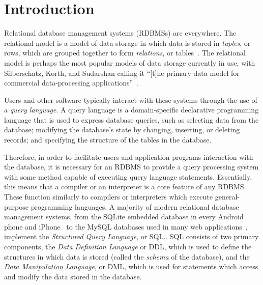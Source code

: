 

\usepackage{minted}
\usepackage{hyperref}
\usepackage{cleveref}
\usepackage{lmodern}
\usepackage{placeins}


\MYHEADERS{}
\PLEDGE{}
\tableofcontents
\listoflistings
\vfill
\pagebreak
\section{Introduction}

Relational database management systems (RDBMSs) are everywhere. The relational model is a model of data storage in which data is stored in \textit{tuples}, or rows, which are grouped together to form \textit{relations}, or tables~\cite{silberschatz2010database,harrington2009relational,garcia2000database}. The relational model is perhaps the most popular models of data storage currently in use, with Silberschatz, Korth, and Sudarshan calling it ``[t]he primary data model for commercial data-processing applications''~\cite[page 39]{silberschatz2010database}.

Users and other software typically interact with these systems through the use of a \textit{query language}. A query language is a domain-specific declarative programming language that is used to express database queries, such as selecting data from the database; modifying the database's state by changing, inserting, or deleting records; and specifying the structure of the tables in the database. 

Therefore, in order to facilitate users and application programs interaction with the database, it is necessary for an RDBMS to provide a query processing system with some method capable of executing query language statements. Essentially, this means that a compiler or an interpreter is a core feature of any RDBMS. These function similarly to compilers or interpreters which execute general-purpose programming languages.
A majority of modern relational database management systems, from the SQLite embedded database in every Android phone and iPhone~\cite{sqliteFamous} to the MySQL databases used in many web applications~\cite{onLamp}, implement the \textit{Structured Query Language}, or SQL.\cite{silberschatz2010database}. %
SQL consists of two primary components, the \textit{Data Definition Language} or DDL, which is used to define the structures in which data is stored (called the \textit{schema} of the database), and the \textit{Data Manipulation Language}, or DML, which is used for statements which access and modify the data stored in the database.




